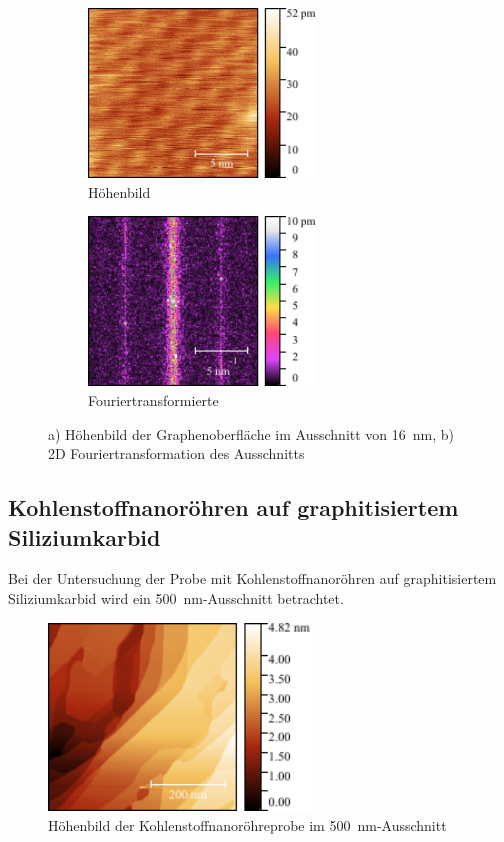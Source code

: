 \documentclass[a4paper,twoside,final]{article}
\begin{document}
\begin{figure}[htp]
    \centering
    \begin{subfigure}{0.45\textwidth}
        \includegraphics[height=4.5cm]{Bilder/Image02005.pdf}
        \caption{Höhenbild}
        \label{fig:16nmGraphen}
    \end{subfigure}
    \hspace{0.5cm}
    \begin{subfigure}{0.45\textwidth}
        \includegraphics[height=4.5cm]{Bilder/Image02005_2DFFT.pdf}
        \caption{Fouriertransformierte}
        \label{fig:16nmFFT}
    \end{subfigure}
    \caption{ a) Höhenbild der Graphenoberfläche im Ausschnitt von \SI{16}{\nano\meter}, b) 2D Fouriertransformation des Ausschnitts}
\end{figure}

\subsection{Kohlenstoffnanoröhren auf graphitisiertem Siliziumkarbid}
Bei der Untersuchung der Probe mit Kohlenstoffnanoröhren auf graphitisiertem Siliziumkarbid wird ein \SI{500}{\nano\meter}-Ausschnitt betrachtet.

\begin{figure}
  \centering
  \includegraphics[height=5cm]{Bilder/Image02138.pdf}
  \caption{Höhenbild der Kohlenstoffnanoröhreprobe im \SI{500}{\nano\meter}-Ausschnitt}
  \label{fig:Kohelstoffnanoröhre}
\end{figure}
\end{document}
